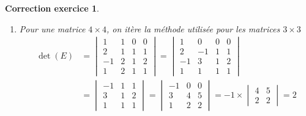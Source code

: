 \documentclass[12pt]{article}
\newtheorem{correction}{\bf Correction exercice}
\newenvironment{cor}{
\begin{correction}\smallskip\normalfont}{\end{correction}
}
\begin{document}
\begin{cor}
\begin{enumerate}
  \item Pour une matrice $4 \times 4$, on itère la méthode utilisée pour les matrices $3 \times 3$
    \begin{align*}
      \det(E)
      &=
      \begin{vmatrix}
        1 & 1 & 0 & 0
        \\
        2 & 1 & 1 & 1
        \\
        -1 & 2 & 1 & 2
        \\
        1 & 2 & 1 & 1
      \end{vmatrix}
      =
      \begin{vmatrix}
        1 & 0 & 0 & 0
        \\
        2 & -1 & 1 & 1
        \\
        -1 & 3 & 1 & 2
        \\
        1 & 1 & 1 & 1
      \end{vmatrix}
      \\
      &=
      \begin{vmatrix}
        -1 & 1 & 1
        \\
        3 & 1 & 2
        \\
        1 & 1 & 1
      \end{vmatrix}
      =
      \begin{vmatrix}
        -1 & 0 & 0
        \\
        3 & 4 & 5
        \\
        1 & 2 & 2
      \end{vmatrix}
      = -1 \times
      \begin{vmatrix}
        4 & 5
        \\
        2 & 2
      \end{vmatrix}
      = 2
    \end{align*}
  \end{enumerate}
    \end{cor}
\color{black}
\fi
\end{document}
